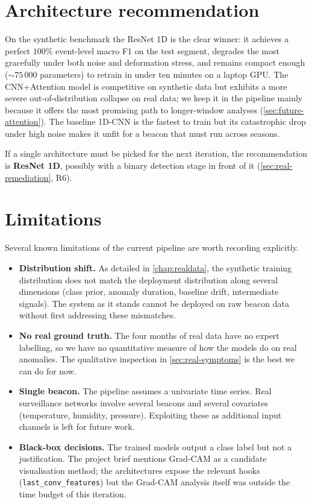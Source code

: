 \section{Architecture recommendation}
\label{sec:conc-archi}

On the synthetic benchmark the ResNet 1D is the clear winner: it
achieves a perfect $100\%$ event-level macro F1 on the test segment,
degrades the most gracefully under both noise and deformation stress,
and remains compact enough ($\sim 75\,000$ parameters) to retrain in
under ten minutes on a laptop GPU. The CNN+Attention model is
competitive on synthetic data but exhibits a more severe
out-of-distribution collapse on real data; we keep it in the pipeline
mainly because it offers the most promising path to longer-window
analyses (\cref{sec:future-attention}). The baseline 1D-CNN is the
fastest to train but its catastrophic drop under high noise makes it
unfit for a beacon that must run across seasons.

If a single architecture must be picked for the next iteration, the
recommendation is \textbf{ResNet 1D}, possibly with a binary
detection stage in front of it (\cref{sec:real-remediation}, R6).

\section{Limitations}
\label{sec:conc-limits}

Several known limitations of the current pipeline are worth recording
explicitly.

\begin{itemize}[leftmargin=*, itemsep=0.25em]
    \item \textbf{Distribution shift.} As detailed in
    \cref{chap:realdata}, the synthetic training distribution does not
    match the deployment distribution along several dimensions (class
    prior, anomaly duration, baseline drift, intermediate signals).
    The system as it stands cannot be deployed on raw beacon data
    without first addressing these mismatches.
    \item \textbf{No real ground truth.} The four months of real data
    have no expert labelling, so we have no quantitative measure of
    how the models do on real anomalies. The qualitative inspection
    in \cref{sec:real-symptoms} is the best we can do for now.
    \item \textbf{Single beacon.} The pipeline assumes a univariate
    time series. Real surveillance networks involve several beacons
    and several covariates (temperature, humidity, pressure).
    Exploiting these as additional input channels is left for
    future work.
    \item \textbf{Black-box decisions.} The trained models output a
    class label but not a justification. The project brief mentions
    Grad-CAM \cite{selvaraju2017gradcam} as a candidate visualisation
    method; the architectures expose the relevant hooks
    (\texttt{last\_conv\_features}) but the Grad-CAM analysis itself
    was outside the time budget of this iteration.
\end{itemize}

